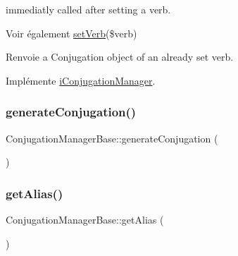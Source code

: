 immediatly called after setting a verb. 

\begin{DoxySeeAlso}{Voir également}
\hyperlink{class_conjugation_manager_base_a36a53a9f0bc2114a5429bcf9e3cd351e}{set\+Verb}(\$verb) 
\end{DoxySeeAlso}
\begin{DoxyReturn}{Renvoie}
a Conjugation object of an already set verb. 
\end{DoxyReturn}


Implémente \hyperlink{interfacei_conjugation_manager_afba24324d7c48d3ab00ffba63cbc1b9e}{i\+Conjugation\+Manager}.

\hypertarget{class_conjugation_manager_base_aa4e4c35d0affaf806ee807878a507b3e}{}\label{class_conjugation_manager_base_aa4e4c35d0affaf806ee807878a507b3e} 
\subsubsection{\texorpdfstring{generate\+Conjugation()}{generateConjugation()}}
{\footnotesize\ttfamily Conjugation\+Manager\+Base\+::generate\+Conjugation (\begin{DoxyParamCaption}{ }\end{DoxyParamCaption})\hspace{0.3cm}{\ttfamily [abstract]}}

\hypertarget{class_conjugation_manager_base_ae737f3f0ee24fc29c25460391bd66ac1}{}\label{class_conjugation_manager_base_ae737f3f0ee24fc29c25460391bd66ac1} 
\subsubsection{\texorpdfstring{get\+Alias()}{getAlias()}}
{\footnotesize\ttfamily Conjugation\+Manager\+Base\+::get\+Alias (\begin{DoxyParamCaption}{ }\end{DoxyParamCaption})}

\hypertarget{class_conjugation_manager_base_aa6fcffaba728e6eb5b28503066bd4b0f}{}\label{class_conjugation_manager_base_aa6fcffaba728e6eb5b28503066bd4b0f} 

